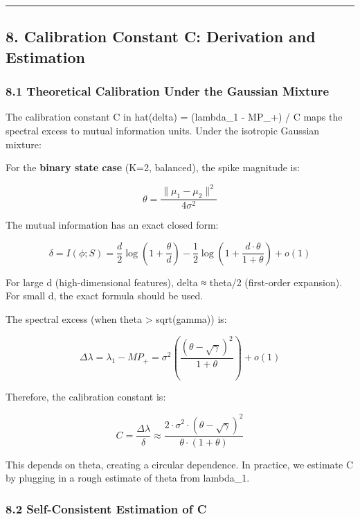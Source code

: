 \documentclass[
  12pt,
]{article}
\begin{document}
\begin{center}\rule{0.5\linewidth}{0.5pt}\end{center}

\subsection{8. Calibration Constant C: Derivation and
Estimation}\label{calibration-constant-c-derivation-and-estimation}

\subsubsection{8.1 Theoretical Calibration Under the Gaussian
Mixture}\label{theoretical-calibration-under-the-gaussian-mixture}

The calibration constant C in hat(delta) = (lambda\_1 - MP\_+) / C maps
the spectral excess to mutual information units. Under the isotropic
Gaussian mixture:

For the \textbf{binary state case} (K=2, balanced), the spike magnitude
is:

\[\theta = \frac{\|\mu_1 - \mu_2\|^2}{4\sigma^2}\]

The mutual information has an exact closed form:

\[\delta = I(\phi; S) = \frac{d}{2} \log\left(1 + \frac{\theta}{d}\right) - \frac{1}{2} \log\left(1 + \frac{d \cdot \theta}{1 + \theta}\right) + o(1)\]

For large d (high-dimensional features), delta ≈ theta/2 (first-order
expansion). For small d, the exact formula should be used.

The spectral excess (when theta \textgreater{} sqrt(gamma)) is:

\[\Delta\lambda = \lambda_1 - MP_+ = \sigma^2 \left( \frac{(\theta - \sqrt{\gamma})^2}{1 + \theta} \right) + o(1)\]

Therefore, the calibration constant is:

\[C = \frac{\Delta\lambda}{\delta} \approx \frac{2 \cdot \sigma^2 \cdot (\theta - \sqrt{\gamma})^2}{\theta \cdot (1 + \theta)}\]

This depends on theta, creating a circular dependence. In practice, we
estimate C by plugging in a rough estimate of theta from lambda\_1.

\subsubsection{8.2 Self-Consistent Estimation of
C}\label{self-consistent-estimation-of-c}
\end{document}
